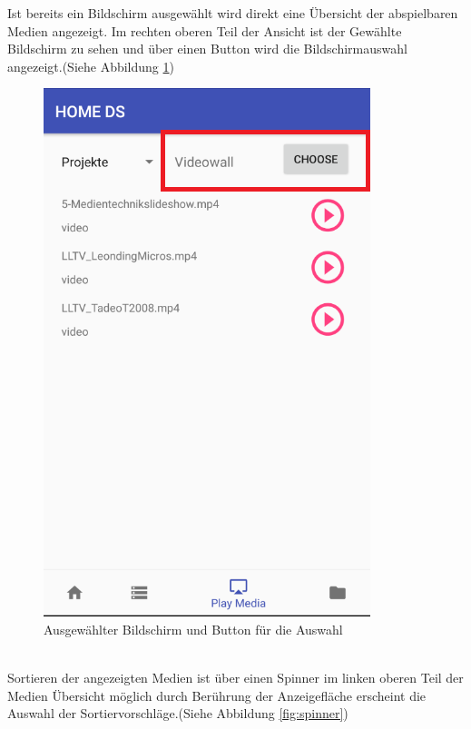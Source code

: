 Ist bereits ein Bildschirm ausgewählt wird direkt eine Übersicht der abspielbaren Medien angezeigt. Im rechten oberen Teil der Ansicht ist der Gewählte Bildschirm zu sehen und über einen Button wird die Bildschirmauswahl angezeigt.(Siehe Abbildung \ref{fig:mediaOv})
\begin{figure}[H]
\centering
\includegraphics[scale=0.35]{images/06_AndroidApp/06_displayTextAndButton}
\caption{Ausgewählter Bildschirm und Button für die Auswahl}
\label{fig:mediaOv}
\end{figure}
\\
Sortieren der angezeigten Medien ist über einen Spinner im linken oberen Teil der Medien Übersicht möglich durch Berührung der Anzeigefläche erscheint die Auswahl der Sortiervorschläge.(Siehe Abbildung \ref{fig:spinner})
